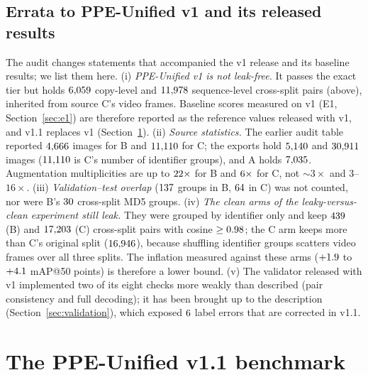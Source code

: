 \documentclass[review,12pt]{elsarticle}
\begin{document}
\subsection{Errata to PPE-Unified v1 and its released results}
\label{sec:errata}
The audit changes statements that accompanied the v1 release and its
baseline results; we list them here.
(i) \emph{PPE-Unified v1 is not leak-free.} It passes the exact tier
but holds $6{,}059$ copy-level and $11{,}978$ sequence-level
cross-split pairs (above), inherited from source C's video frames.
Baseline scores measured on v1 (E1, Section~\ref{sec:e1}) are
therefore reported as the reference values released with v1, and v1.1 replaces
v1 (Section~\ref{sec:dataset}).
(ii) \emph{Source statistics.} The earlier audit table reported
$4{,}666$ images for B and $11{,}110$ for C; the exports hold $5{,}140$ and
$30{,}911$ images ($11{,}110$ is C's number of identifier groups), and
A holds $7{,}035$. Augmentation multiplicities are up to
$22\times$ for B and $6\times$ for C, not
${\sim}3\times$ and $3$--$16\times$.
(iii) \emph{Validation--test overlap} ($137$ groups in B, $64$ in
C) was not counted, nor were B's $30$ cross-split MD5
groups.
(iv) \emph{The clean arms of the leaky-versus-clean experiment still
leak.} They were grouped by identifier only and keep $439$
(B) and $17{,}203$ (C) cross-split pairs with cosine
$\ge0.98$; the C arm keeps more than C's original split
($16{,}946$), because shuffling identifier groups scatters video
frames over all three splits. The inflation measured against these
arms ($+1.9$ to $+4.1$ mAP@50 points) is therefore a lower
bound.
(v) The validator released with v1 implemented two of its eight
checks more weakly than described (pair consistency and full decoding);
it has been brought up to the description
(Section~\ref{sec:validation}), which exposed $6$ label
errors that are corrected in v1.1.

\section{The PPE-Unified v1.1 benchmark}
\label{sec:dataset}
\end{document}
